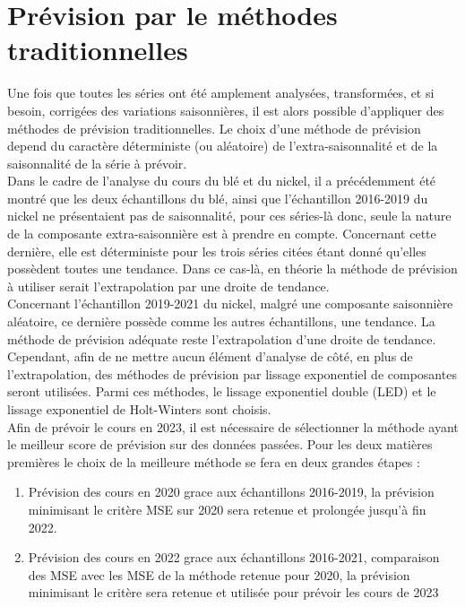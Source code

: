 \section{Prévision par le méthodes traditionnelles}\label{sec:tradi}
Une fois que toutes les séries ont été amplement analysées, transformées, et si besoin, corrigées des variations saisonnières, il est alors possible d'appliquer des 
méthodes de prévision traditionnelles. Le choix d'une méthode de prévision depend du caractère déterministe (ou aléatoire) de l'extra-saisonnalité et de la saisonnalité de
la série à prévoir. \\[11pt]
Dans le cadre de l'analyse du cours du blé et du nickel, il a précédemment été montré que les deux échantillons du blé, ainsi que l'échantillon 2016-2019 
du nickel ne présentaient pas de saisonnalité, pour ces séries-là donc, seule la nature de la composante extra-saisonnière est à prendre en compte. Concernant cette 
dernière, elle est déterministe pour les trois séries citées étant donné qu'elles possèdent toutes une tendance. Dans ce cas-là, en théorie la méthode de prévision à 
utiliser serait l'extrapolation par une droite de tendance.\\[11pt]
Concernant l'échantillon 2019-2021 du nickel, malgré une composante saisonnière aléatoire, ce dernière possède comme les autres échantillons, une tendance. La méthode de 
prévision adéquate reste l'extrapolation d'une droite de tendance.\\[11pt]
Cependant, afin de ne mettre aucun élément d'analyse de côté, en plus de l'extrapolation, des méthodes de prévision par lissage exponentiel de composantes seront 
utilisées. Parmi ces méthodes, le lissage exponentiel double (LED) et le lissage exponentiel de Holt-Winters sont choisis. \\[11pt]
Afin de prévoir le cours en 2023, il est nécessaire de sélectionner la méthode ayant le meilleur score de prévision sur des données passées. Pour les deux matières 
premières le choix de la meilleure méthode se fera en deux grandes étapes :
\begin{enumerate}
    \item Prévision des cours en 2020 grace aux échantillons 2016-2019, la prévision minimisant le critère MSE sur 2020 sera retenue et prolongée jusqu'à fin 2022.
    \item Prévision des cours en 2022 grace aux échantillons 2016-2021, comparaison des MSE avec les MSE de la méthode retenue pour 2020, la prévision minimisant le 
            critère sera retenue et utilisée pour prévoir les cours de 2023 
\end{enumerate}

